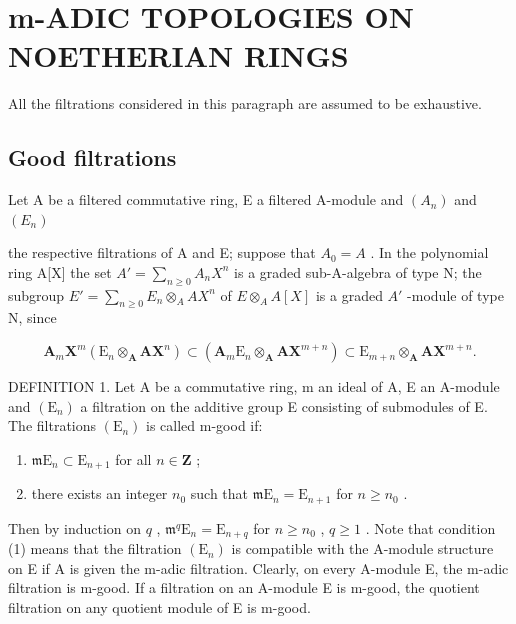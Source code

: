 \section{m-ADIC TOPOLOGIES ON NOETHERIAN RINGS}

All the filtrations considered in this paragraph are assumed to be exhaustive.

\subsection{Good filtrations}

Let A be a filtered commutative ring, E a filtered A-module and \((A_{n})\) and \((E_{n})\)

the respective filtrations of A and E; suppose that \(A_{0} = A\) . In the polynomial ring A{[}X{]} the set \(A' = \sum_{n \geqslant 0} A_{n} X^{n}\) is a graded sub-A-algebra of type N; the subgroup \(E' = \sum_{n \geqslant 0} E_{n} \otimes_{A} A X^{n}\) of \(E \otimes_{A} A[X]\) is a graded \(A'\) -module of type N, since

\[
\mathbf {A} _ {m} \mathbf {X} ^ {m} (\mathrm{E} _ {n} \otimes_ {\mathbf {A}} \mathbf {A X} ^ {n}) \subset (\mathbf {A} _ {m} \mathrm{E} _ {n} \otimes_ {\mathbf {A}} \mathbf {A X} ^ {m + n}) \subset \mathrm{E} _ {m + n} \otimes_ {\mathbf {A}} \mathbf {A X} ^ {m + n}.
\]

DEFINITION 1. Let A be a commutative ring, m an ideal of A, E an A-module and \((\mathrm{E}_{n})\) a filtration on the additive group E consisting of submodules of E. The filtrations \((\mathrm{E}_{n})\) is called m-good if:

\begin{enumerate}
\def\labelenumi{(\arabic{enumi})}
\item
  \(\mathfrak{m}\mathrm{E}_n\subset \mathrm{E}_{n + 1}\) for all \(n\in \mathbf{Z}\) ;
\item
  there exists an integer \(n_0\) such that \(\mathfrak{m}\mathrm{E}_n = \mathrm{E}_{n+1}\) for \(n \geqslant n_0\) .
\end{enumerate}

Then by induction on \(q\) , \(\mathfrak{m}^q\mathrm{E}_n = \mathrm{E}_{n + q}\) for \(n \geqslant n_0\) , \(q \geqslant 1\) . Note that condition (1) means that the filtration \((\mathrm{E}_n)\) is compatible with the A-module structure on E if A is given the m-adic filtration. Clearly, on every A-module E, the m-adic filtration is m-good. If a filtration on an A-module E is m-good, the quotient filtration on any quotient module of E is m-good.

